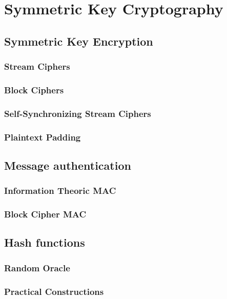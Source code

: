 \documentclass[10pt]{article}
\begin{document}
\section{Symmetric Key Cryptography}{
  \subsection{Symmetric Key Encryption}{
    \subsubsection{Stream Ciphers}{
      
    }
    \subsubsection{Block Ciphers}{
      
    }
    \subsubsection{Self-Synchronizing Stream Ciphers}{
      
    }
    \subsubsection{Plaintext Padding}{
      
    }
  }
  \subsection{Message authentication}{
    
    \subsubsection{Information Theoric MAC}{
      
    }
    \subsubsection{Block Cipher MAC}{
    }
  }
  \subsection{Hash functions}{
    \subsubsection{Random Oracle}{
    }
    \subsubsection{Practical Constructions}{
    }
}}
\end{document}
